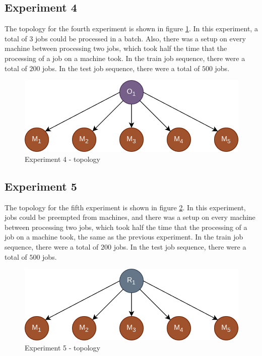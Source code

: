 \subsection{Experiment 4}

The topology for the fourth experiment is shown in figure \ref{fig:experiment4_topology}. In this experiment, a total of $3$ jobs could be processed in a batch. Also, there was a setup on every machine between processing two jobs, which took half the time that the processing of a job on a machine took. In the train job sequence, there were a total of $200$ jobs. In the test job sequence, there were a total of $500$ jobs.

\begin{figure}[!htbp]
	\centering
	\includegraphics[scale=0.3]{../images/experiment4_topology.png}
	\caption{Experiment 4 - topology}
    \label{fig:experiment4_topology}
\end{figure}

\subsection{Experiment 5}

The topology for the fifth experiment is shown in figure \ref{fig:experiment5_topology}. In this experiment, jobs could be preempted from machines, and there was a setup on every machine between processing two jobs, which took half the time that the processing of a job on a machine took, the same as the previous experiment. In the train job sequence, there were a total of $200$ jobs. In the test job sequence, there were a total of $500$ jobs.

\begin{figure}[!htbp]
	\centering
	\includegraphics[scale=0.3]{../images/experiment5_topology.png}
	\caption{Experiment 5 - topology}
    \label{fig:experiment5_topology}
\end{figure}